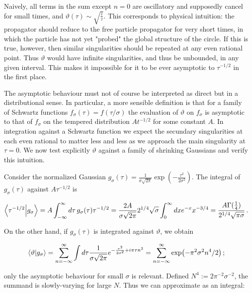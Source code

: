 \documentclass{article}
\newcommand{\T}{\ensuremath{\vartheta}}
\newcommand{\intR}{\int_{-\infty}^\infty}
\newcommand{\sumZ}{\sum_{n=-\infty}^{\infty}}
\begin{document}
Naively, all terms in the sum except $n=0$ are oscillatory and supposedly cancel for small times, and $\vartheta(\tau) \sim \sqrt{\frac{i}{\tau}}$. This corresponds to physical intuition: the propagator should reduce to the free particle propagator for very short times, in which the particle has not yet "probed" the global structure of the circle. If this is true, however, then similar singularities should be repeated at any even rational point. Thus $\T$ would have infinite singularities, and thus be unbounded, in any given interval. This makes it impossible for it to be ever asymptotic to $\tau^{-1/2}$ in the first place.

The asymptotic behaviour must not of course be interpreted as direct but in a distributional sense. In particular, a more sensible definition is that for a family of Schwartz functions $f_\sigma(\tau) = f(\tau/\sigma)$ the evaluation of $\vartheta$ on $f_\sigma$ is asymptotic to that of $f_\sigma$ on the tempered distribution $A t^{-1/2}$ for some constant $A$. In integration against a Schwartz function we expect the secundary singularities at each even rational to matter less and less as we approach the main singularity at $\tau = 0$. We now test explicitly $\vartheta$ against a family of shrinking Gaussians and verify this intuition.

Consider the normalized Gaussian $g_\sigma(\tau) = \frac{1}{\sigma \sqrt{2\pi}} \exp(-\frac{\tau^2}{2\sigma^2})$. The integral of $g_\sigma(\tau)$ against $A \tau^{-1/2}$ is

\begin{equation}
    \bra{\tau^{-1/2}}\ket{g_\sigma} =  A \intR d\tau \, g_\sigma(\tau) \tau^{-1/2} = \frac{2A}{\sigma\sqrt{2\pi}} 2^{1/4} \sqrt\sigma \int_0^\infty dx e^{-x} x^{-3/4} = \frac{A\Gamma(\frac{1}{4})}{2^{1/4}\sqrt{\pi\sigma}}\,.
\end{equation}

On the other hand, if $g_\sigma(\tau)$ is integrated against $\vartheta$, we obtain

\begin{equation}
    \bra{\vartheta}\ket{g_\sigma} = \sumZ \int d\tau \frac{1}{\sigma \sqrt{2\pi}} e^{-\frac{\tau^2}{2\sigma^2} + i\pi\tau n^2}  = \sumZ \exp(-\pi^2 \sigma^2 n^4 / 2)\,; 
\end{equation}

only the asymptotic behaviour for small $\sigma$ is relevant. Defined $N^4 := 2 \pi^{-2} \sigma^{-2}$, the summand is slowly-varying for large $N$. Thus we can approximate as an integral:
\end{document}
